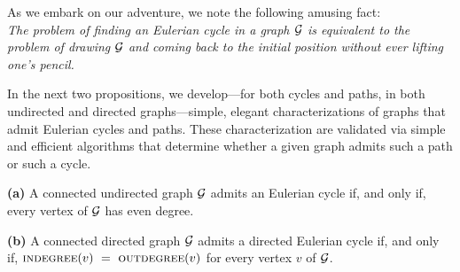 As we embark on our adventure, we note the following amusing fact: \\
{\em The problem of finding an Eulerian cycle in a graph $\mbox{$\cal G$}$ is
equivalent to the problem of drawing $\mbox{$\cal G$}$ 
{\Denis and coming back to the initial position}
without ever lifting one's
pencil.} 

\medskip

In the next two propositions, we develop---for both cycles and paths, in both undirected and directed
graphs---simple, elegant characterizations of graphs that admit Eulerian cycles and paths.
These characterization are validated via simple and efficient algorithms that determine
whether a given graph admits such a path or such a cycle.

\begin{prop}
\label{thm:eulerian-cycle}
{\bf (a)}
A connected undirected graph $\mbox{$\cal G$}$ admits an Eulerian cycle if, and only if,
every vertex of $\mbox{$\cal G$}$ has even degree.

{\bf (b)}
A connected directed graph $\mbox{$\cal G$}$ admits a directed Eulerian cycle if, and only if,
$\mbox{\sc indegree}(v) \ = \ \mbox{\sc outdegree}(v)$
for every vertex $v$ of $\mbox{$\cal G$}$.
\end{prop}


